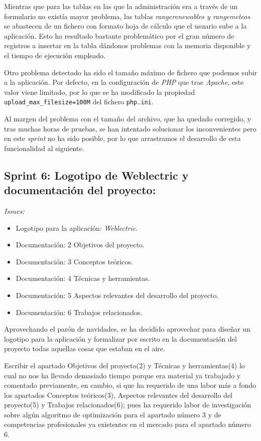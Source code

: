 Mientras que para las tablas en las que la administración era a través de un formulario no existía mayor problema, las tablas \textit{rangerenewables y rangemeteos} se abastecen de un fichero con formato hoja de cálculo que el usuario sube a la aplicación. Esto ha resultado bastante problemático por el gran número de registros a insertar en la tabla dándonos problemas con la memoria disponible y el tiempo de ejecución empleado.

Otro problema detectado ha sido el tamaño máximo de fichero que podemos subir a la aplicación. Por defecto, en la configuración de \textit{PHP} que trae \textit{Apache}, este valor viene limitado, por lo que se ha modificado la propiedad  \verb|upload_max_filesize=100M| del fichero \verb|php.ini|.

Al margen del problema con el tamaño del archivo, que ha quedado corregido, y tras muchas horas de pruebas, se han intentado solucionar los inconvenientes pero en este \textit{sprint} no ha sido posible, por lo que arrastramos el desarrollo de esta funcionalidad al siguiente.


\subsection{Sprint 6: Logotipo de Weblectric y documentación del proyecto:}
\textit{Issues:}
\begin{itemize}
	\item Logotipo para la aplicación: \textit{Weblectric}.
	\item Documentación: 2 Objetivos del proyecto.
	\item Documentación: 3 Conceptos teóricos.
	\item Documentación: 4 Técnicas y herramientas.
	\item Documentación: 5 Aspectos relevantes del desarrollo del proyecto.
	\item Documentación: 6 Trabajos relacionados.
\end{itemize}

Aprovechando el parón de navidades, se ha decidido aprovechar para diseñar un logotipo para la aplicación y formalizar por escrito en la documentación del proyecto todas aquellas cosas que estaban en el aire.

Escribir el apartado \guillemotleft Objetivos del proyecto\guillemotright(2) y \guillemotleft Técnicas y herramientas\guillemotright(4) lo cual no nos ha llevado demasiado tiempo porque era material ya trabajado y comentado previamente, en cambio, si que ha requerido de una labor más a fondo los apartados \guillemotleft Conceptos teóricos\guillemotright(3), \guillemotleft Aspectos relevantes del desarrollo del proyecto\guillemotright(5) y \guillemotleft Trabajos relacionados\guillemotright(6); pues ha requerido labor de investigación sobre algún algoritmo de optimización para el apartado número 3 y de competencias profesionales ya existentes en el mercado para el apartado número 6. 


